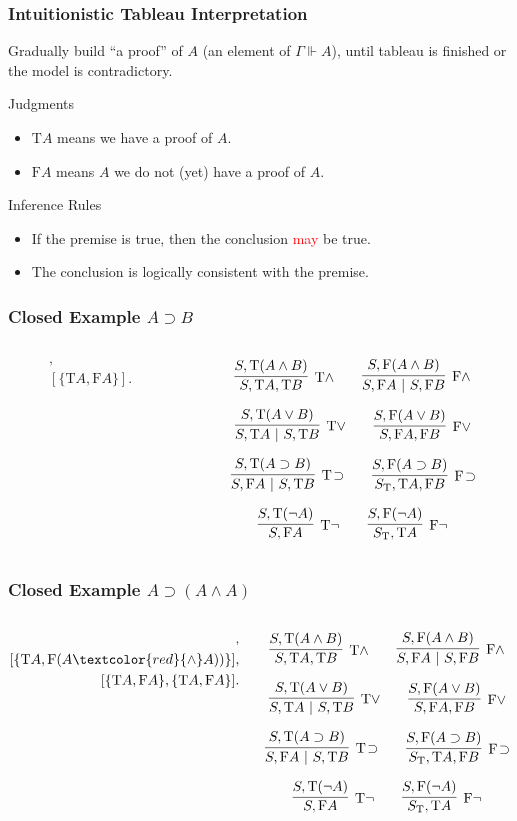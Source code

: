 \documentclass[mathserif]{beamer}
\def\|{~|~}
\def\T{\textrm{T}}
\def\F{\textrm{F}}
\def\imp{\supset}
\newcommand{\diff}[1]{\textcolor{red}{#1}}
\newcommand{\force}[1]{\Gamma \Vdash #1}
\def\mycalc{
$$
\infer
  [\T \land]
  {S , \T A , \T B}
{
  {S , \T(A \land B)}
}
\qquad
\infer
  [\F \land]
  {S, \F A \| S, \F B}
{
  {S, \F(A \land B)}
}
$$

$$
\infer
  [\T \lor]
  {S , \T A \| S , \T B}
{
  {S , \T(A \lor B)}
}
\qquad
\infer
  [\F \lor]
  {S, \F A , \F B}
{
  {S, \F(A \lor B)}
}
$$

$$
\infer
  [\T \! \imp]
  {S , \F A \| S , \T B}
{
  {S , \T(A \imp B)}
}
\qquad
\infer
  [\F \! \imp]
  {S_{\T}, \T A , \F B}
{
  {S, \F(A \imp B)}
}
$$

$$
\infer
  [\T \neg]
  {S , \F A}
{
  {S , \T(\neg A)}
}
\qquad
\infer
  [\F \neg]
  {S_{\T}, \T A}
{
  {S, \F(\neg A)}
}
$$
}
\begin{document}
\begin{frame}
\frametitle{Intuitionistic Tableau Interpretation}

Gradually build ``a proof'' of $A$ (an element of $\force{A}$),
until tableau is finished or the model is contradictory.

\begin{block}{Judgments}
\begin{itemize}
\item $\T A$ means we have a proof of $A$.
\item $\F A$ means $A$ we do not (yet) have a proof of $A$.
\end{itemize}
\end{block}

\begin{block}{Inference Rules}
\begin{itemize}
\item If the premise is true, then the conclusion \diff{may} be true.
\item The conclusion is logically consistent with the premise.
\end{itemize}
\end{block}

\end{frame}


\begin{frame}
\frametitle{Closed Example $A \imp B$}

\begin{columns}[T]
\begin{column}[T]{4cm}
\begin{align*}
[\{ \F(A \diff{\imp} B) \}],\\
[\{ \T A, \F A \}].
\end{align*}
\end{column}

\begin{column}[T]{7cm}
\mycalc
\end{column}
\end{columns}

\end{frame}

\begin{frame}
\frametitle{Closed Example $A \imp (A \land A)$}

\begin{columns}[T]
\begin{column}[T]{4cm}
\begin{align*}
[\{ \F(A \diff{\imp} (A \land A)) \}],\\
[\{ \T A, \F(A \diff{\land} A)) \}],\\
[\{ \T A, \F A \}, \{ \T A, \F A \}].
\end{align*}
\end{column}

\begin{column}[T]{7cm}
\mycalc
\end{column}
\end{columns}

\end{frame}
\end{document}
